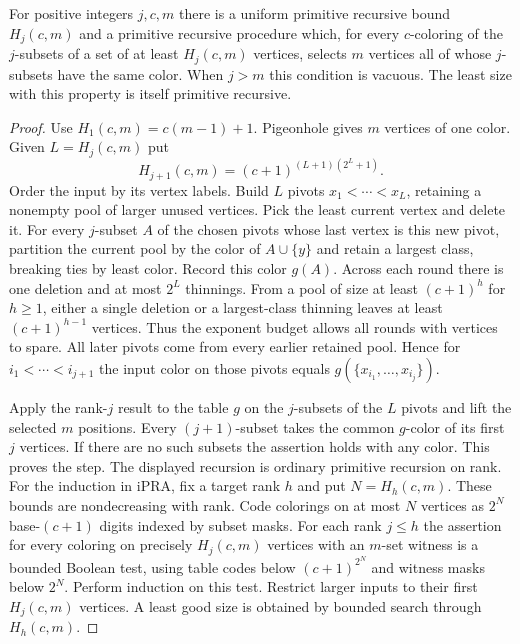 \begin{theorem}\label{result32}\label{thm:graph-hyperramsey}
For positive integers $j,c,m$ there is a uniform primitive recursive bound $H_j(c,m)$ and a primitive recursive procedure which, for every $c$-coloring of the $j$-subsets of a set of at least $H_j(c,m)$ vertices, selects $m$ vertices all of whose $j$-subsets have the same color. When $j>m$ this condition is vacuous. The least size with this property is itself primitive recursive.
\end{theorem}
\begin{proof}
Use $H_1(c,m)=c(m-1)+1$. Pigeonhole gives $m$ vertices of one color. Given $L=H_j(c,m)$ put
\[
 H_{j+1}(c,m)=(c+1)^{(L+1)(2^L+1)}.
\]
Order the input by its vertex labels. Build $L$ pivots $x_1<\cdots<x_L$, retaining a nonempty pool of larger unused vertices. Pick the least current vertex and delete it. For every $j$-subset $A$ of the chosen pivots whose last vertex is this new pivot, partition the current pool by the color of $A\cup\{y\}$ and retain a largest class, breaking ties by least color. Record this color $g(A)$. Across each round there is one deletion and at most $2^L$ thinnings. From a pool of size at least $(c+1)^h$ for $h\ge1$, either a single deletion or a largest-class thinning leaves at least $(c+1)^{h-1}$ vertices. Thus the exponent budget allows all rounds with vertices to spare. All later pivots come from every earlier retained pool. Hence for $i_1<\cdots<i_{j+1}$ the input color on those pivots equals $g(\{x_{i_1},\ldots,x_{i_j}\})$.

Apply the rank-$j$ result to the table $g$ on the $j$-subsets of the $L$ pivots and lift the selected $m$ positions. Every $(j+1)$-subset takes the common $g$-color of its first $j$ vertices. If there are no such subsets the assertion holds with any color. This proves the step. The displayed recursion is ordinary primitive recursion on rank. For the induction in iPRA, fix a target rank $h$ and put $N=H_h(c,m)$. These bounds are nondecreasing with rank. Code colorings on at most $N$ vertices as $2^N$ base-$(c+1)$ digits indexed by subset masks. For each rank $j\le h$ the assertion for every coloring on precisely $H_j(c,m)$ vertices with an $m$-set witness is a bounded Boolean test, using table codes below $(c+1)^{2^N}$ and witness masks below $2^N$. Perform induction on this test. Restrict larger inputs to their first $H_j(c,m)$ vertices. A least good size is obtained by bounded search through $H_h(c,m)$.
\end{proof}

